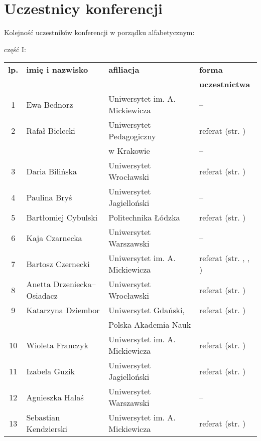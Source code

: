 \documentclass[12pt,oneside]{book}
\begin{document}
\chapter{Uczestnicy konferencji}

Kolejność uczestników konferencji w porządku alfabetycznym:

\vspace{1cm}

\Large część I:

\normalsize
\begin{tabular}{||c|l|l|l||}
\hline
\hline
\textbf{lp.} & \textbf{imię i nazwisko} & \textbf{afiliacja} & \textbf{forma}\\
 &  &  & \textbf{uczestnictwa}\\
\hline
\hline
\hline
1	 & Ewa Bednorz & Uniwersytet im. A. Mickiewicza & -- \\\hline
2	 & Rafał Bielecki & Uniwersytet Pedagogiczny & referat (str. \pageref{bielecki})\\
	 &  & w Krakowie & -- \\\hline
3	 & Daria Bilińska & Uniwersytet Wrocławski & referat (str. \pageref{bilinska}) \\\hline
4	 & Paulina Bryś & Uniwersytet Jagielloński & -- \\\hline
5	 & Bartłomiej Cybulski & Politechnika Łódzka & referat (str. \pageref{cybulski}) \\\hline
6	 & Kaja Czarnecka & Uniwersytet Warszawski & -- \\\hline
7	 & Bartosz Czernecki & Uniwersytet im. A. Mickiewicza & referat (str. \pageref{kolendowicz}, \pageref{taszarek}, \pageref{pilguj}) \\\hline
8	 & Anetta Drzeniecka--Osiadacz & Uniwersytet Wrocławski & referat (str. \pageref{bilinska}) \\\hline
9 	 & Katarzyna Dziembor & Uniwersytet Gdański, & referat (str. \pageref{dziembor})\\
		 &  & Polska Akademia Nauk &  \\\hline
10	 & Wioleta Franczyk & Uniwersytet im. A. Mickiewicza & referat  (str. \pageref{franczyk})\\\hline
11	 & Izabela Guzik & Uniwersytet Jagielloński & referat (str. \pageref{guzik})\\\hline	
 12	 & Agnieszka Halaś & Uniwersytet Warszawski & -- \\\hline	
 13 & Sebastian Kendzierski & Uniwersytet im. A. Mickiewicza & referat (str. \pageref{kendzierski}) \\\hline

\end{tabular}
\end{document}
